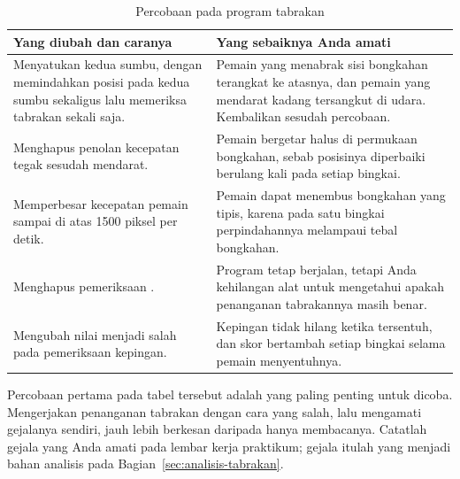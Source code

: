 \begin{table}[htbp]
\centering
\caption{Percobaan pada program tabrakan}
\label{tab:percobaan-ch07}
{\setlength{\tabcolsep}{4pt}\footnotesize%
\begin{tabularx}{\textwidth}{@{}L{5.6cm} Y@{}}
\toprule
\headrow \textbf{Yang diubah dan caranya} & \textbf{Yang sebaiknya Anda amati} \\
\midrule
Menyatukan kedua sumbu, dengan memindahkan posisi pada kedua sumbu sekaligus
lalu memeriksa tabrakan sekali saja. &
Pemain yang menabrak sisi bongkahan terangkat ke atasnya, dan pemain yang
mendarat kadang tersangkut di udara. Kembalikan sesudah percobaan. \\
\addlinespace
Menghapus penolan kecepatan tegak sesudah mendarat. &
Pemain bergetar halus di permukaan bongkahan, sebab posisinya diperbaiki
berulang kali pada setiap bingkai. \\
\addlinespace
Memperbesar kecepatan pemain sampai di atas 1500 piksel per detik. &
Pemain dapat menembus bongkahan yang tipis, karena pada satu bingkai
perpindahannya melampaui tebal bongkahan. \\
\addlinespace
Menghapus pemeriksaan . &
Program tetap berjalan, tetapi Anda kehilangan alat untuk mengetahui apakah
penanganan tabrakannya masih benar. \\
\addlinespace
Mengubah nilai  menjadi salah pada pemeriksaan kepingan. &
Kepingan tidak hilang ketika tersentuh, dan skor bertambah setiap bingkai
selama pemain menyentuhnya. \\
\bottomrule
\end{tabularx}}
\end{table}

\begin{peringatanbox}
Percobaan pertama pada tabel tersebut adalah yang paling penting untuk dicoba.
Mengerjakan penanganan tabrakan dengan cara yang salah, lalu mengamati
gejalanya sendiri, jauh lebih berkesan daripada hanya membacanya. Catatlah
gejala yang Anda amati pada lembar kerja praktikum; gejala itulah yang menjadi
bahan analisis pada Bagian~\ref{sec:analisis-tabrakan}.
\end{peringatanbox}
